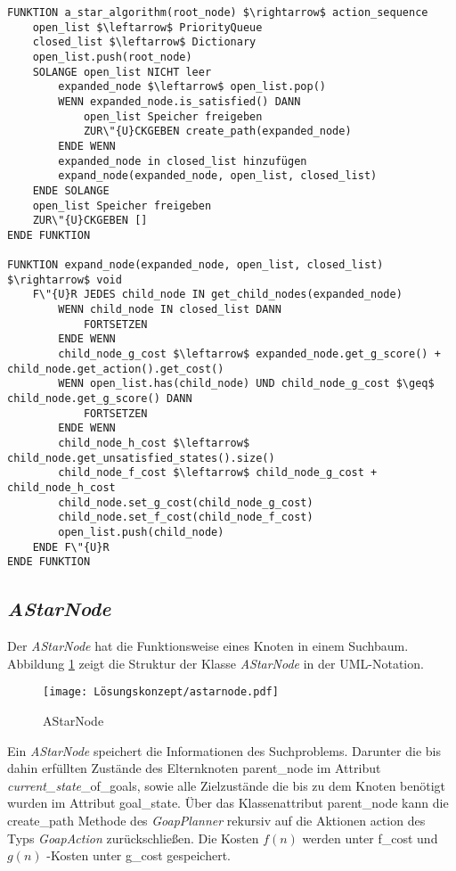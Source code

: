\begin{lstlisting}[language=Pseudo, caption={update Methode des \textit{GoapAgent}}, mathescape=true]
FUNKTION a_star_algorithm(root_node) $\rightarrow$ action_sequence
	open_list $\leftarrow$ PriorityQueue
	closed_list $\leftarrow$ Dictionary
	open_list.push(root_node)
	SOLANGE open_list NICHT leer
		expanded_node $\leftarrow$ open_list.pop()
		WENN expanded_node.is_satisfied() DANN
			open_list Speicher freigeben
			ZUR\"{U}CKGEBEN create_path(expanded_node)
		ENDE WENN
		expanded_node in closed_list hinzufügen
		expand_node(expanded_node, open_list, closed_list)
	ENDE SOLANGE
	open_list Speicher freigeben
	ZUR\"{U}CKGEBEN []
ENDE FUNKTION

FUNKTION expand_node(expanded_node, open_list, closed_list) $\rightarrow$ void
	F\"{U}R JEDES child_node IN get_child_nodes(expanded_node)
		WENN child_node IN closed_list DANN
			FORTSETZEN
		ENDE WENN
		child_node_g_cost $\leftarrow$ expanded_node.get_g_score() + child_node.get_action().get_cost()
		WENN open_list.has(child_node) UND child_node_g_cost $\geq$ child_node.get_g_score() DANN
			FORTSETZEN
		ENDE WENN
		child_node_h_cost $\leftarrow$ child_node.get_unsatisfied_states().size()
		child_node_f_cost $\leftarrow$ child_node_g_cost + child_node_h_cost
		child_node.set_g_cost(child_node_g_cost)
		child_node.set_f_cost(child_node_f_cost)
		open_list.push(child_node)
	ENDE F\"{U}R
ENDE FUNKTION
\end{lstlisting}

\subsection{\textit{AStarNode}}
\label{chap:astarnode uml}

Der \textit{AStarNode} hat die Funktionsweise eines Knoten in einem Suchbaum. Abbildung \ref{fig:AStarNode} zeigt die Struktur der Klasse \textit{AStarNode} in der UML-Notation.

\begin{figure}[h]
  \centering
  \texttt{[image: Lösungskonzept/astarnode.pdf]}
	\captionsetup{justification=justified, format=plain}
  \caption{AStarNode}
  \label{fig:AStarNode}
\end{figure}


Ein \textit{AStarNode} speichert die Informationen des Suchproblems. Darunter die bis dahin erfüllten Zustände des Elternknoten parent\_node im Attribut \textit{current\_state}\_of\_goals, sowie alle Zielzustände die bis zu dem Knoten benötigt wurden im Attribut goal\_state. \"{U}ber das Klassenattribut parent\_node kann die create\_path Methode des \textit{GoapPlanner} rekursiv auf die Aktionen action des Typs \textit{GoapAction} zurückschlie\ss{}en. Die Kosten $f(n)$ werden unter f\_cost und $g(n)$ -Kosten unter g\_cost gespeichert.



